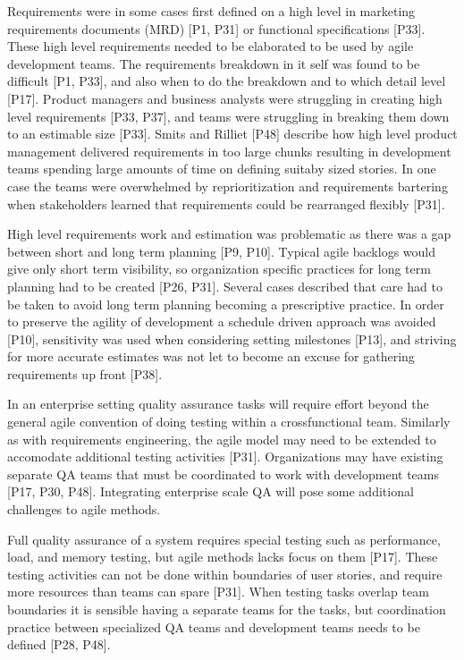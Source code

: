 \documentclass[preprint,authoryear,12pt]{elsarticle}
\begin{document}
Requirements were in some cases first defined on a high level in marketing
requirements documents (MRD) [P1, P31] or functional specifications [P33].
These high level requirements needed to be elaborated to be used by agile
development teams. The requirements breakdown in it self was found to be
difficult [P1, P33], and also when to do the breakdown and to which detail level
[P17].
Product managers and business analysts were struggling in creating high level
requirements [P33, P37], and teams were struggling in breaking them down to an
estimable size [P33]. Smits and Rilliet [P48] describe how high level product
management delivered requirements in too large chunks resulting in development
teams spending large amounts of time on defining suitaby sized stories.
In one case the teams were overwhelmed by reprioritization and requirements
bartering when stakeholders learned that requirements could be rearranged
flexibly [P31].


High level requirements work and estimation was problematic as there was a gap
between short and long term planning [P9, P10]. Typical agile backlogs would
give only short term visibility, so organization specific practices for long
term planning had to be created [P26, P31]. Several cases described that care
had to be taken to avoid long term planning becoming a prescriptive practice. In
order to preserve the agility of development a schedule driven approach was
avoided [P10], sensitivity was used when considering setting milestones [P13],
and striving for more accurate estimates was not let to become an excuse for
gathering requirements up front [P38].


In an enterprise setting quality assurance tasks will require effort beyond the
general agile convention of doing testing within a crossfunctional team.
Similarly as with requirements engineering, the agile model may need to be
extended to accomodate additional testing activities [P31]. Organizations may
have existing separate QA teams that must be coordinated to work with
development teams [P17, P30, P48]. Integrating enterprise scale QA will pose
some additional challenges to agile methods.

Full quality assurance of a system requires special testing such as performance,
load, and memory testing, but agile methods lacks focus on them [P17]. These
testing activities can not be done within boundaries of user stories, and
require more resources than teams can spare [P31]. When testing tasks overlap
team boundaries it is sensible having a separate teams for the tasks, but
coordination practice between specialized QA teams and development teams needs
to be defined [P28, P48].
\end{document}
